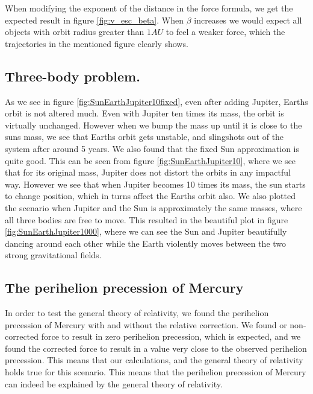 \documentclass[../main.tex]{subfiles}
\begin{document}
When modifying the exponent of the distance in the force formula, we get the expected result in figure \ref{fig:v_esc_beta}. When $\beta$ increases we would expect all objects with orbit radius greater than $1AU$ to feel a weaker force, which the trajectories in the mentioned figure clearly shows.

\subsection{Three-body problem.}
As we see in figure \ref{fig:SunEarthJupiter10fixed}, even after adding Jupiter, Earths orbit is not altered much. Even with Jupiter ten times its mass, the orbit is virtually unchanged. However when we bump the mass up until it is close to the suns mass, we see that Earths orbit gets unstable, and slingshots out of the system after around 5 years.
We also found that the fixed Sun approximation is quite good. This can be seen from figure \ref{fig:SunEarthJupiter10}, where we see that for its original mass, Jupiter does not distort the orbits in any impactful way. However we see that when Jupiter becomes 10 times its mass, the sun starts to change position, which in turns affect the Earths orbit also. We also plotted the scenario when Jupiter and the Sun is approximately the same masses, where all three bodies are free to move. This resulted in the beautiful plot in figure \ref{fig:SunEarthJupiter1000}, where we can see the Sun and Jupiter beautifully dancing around each other while the Earth violently moves between the two strong gravitational fields.



\subsection{The perihelion precession of Mercury}
In order to test the general theory of relativity, we found the perihelion precession of Mercury with and without the relative correction. We found or non-corrected force to result in zero perihelion precession, which is expected, and we found the corrected force to result in a value very close to the observed perihelion precession. This means that our calculations, and the general theory of relativity holds true for this scenario.
This means that the perihelion precession of Mercury can indeed be explained by the general theory of relativity.
\end{document}
